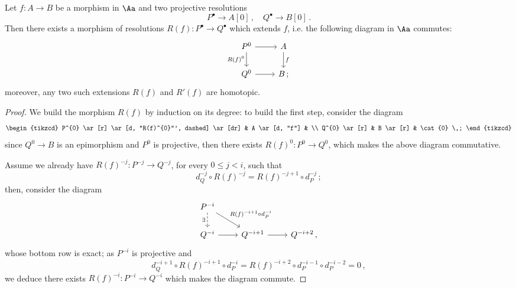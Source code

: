 \begin{prop}\label{res-htp}
    Let $f : A \to B$ be a morphism in $\Aa$ and two projective resolutions
    \begin{equation*}
        P^{\bullet} \longrightarrow A{[0]}\,, \quad
        Q^{\bullet} \longrightarrow B{[0]}\,.
    \end{equation*}
    Then there exists a morphism of resolutions 
    $R(f) : P^{\bullet} \to Q^{\bullet}$ which extends $f$,
    i.e. the following diagram in $\Aa$ commutes:
    \begin{equation*}
        \begin{tikzcd}
            P^{0} \ar[r] \ar[d, "R(f)^{0}"'] 
            & A \ar[d, "f"] \\
            Q^{0} \ar[r] & B\,;
        \end{tikzcd}
    \end{equation*}
    moreover, any two such extensions $R(f)$ and $R'(f)$ are homotopic.
    \begin{proof}
        We build the morphism $R(f)$ by induction on its degree:
        to build the first step, consider the diagram
        \begin{equation*}
        \begin{tikzcd}
            P^{0} \ar[r] \ar[d, "R(f)^{0}"', dashed] \ar[dr]
            & A \ar[d, "f"] & \\
            Q^{0} \ar[r] & B \ar[r] & \cat{0} \,;
        \end{tikzcd}
    \end{equation*}
    since $Q^{0} \to B$ is an epimorphism and $P^{0}$
    is projective, then there exists $R(f)^{0}:P^{0} \to Q^{0}$,
    which makes the above diagram commutative.

    Assume we already have $R(f)^{-j} : P^{-j} \to Q^{-j}$, 
    for every $0 \le j < i$, such that
    \begin{equation*}
        d_{Q}^{-j} \circ R(f)^{-j} = R(f)^{-j+1} \circ d_{P}^{-j}\,;
    \end{equation*}
    then, consider the diagram
    \begin{equation*}
        \begin{tikzcd}
            P^{-i} \ar[d, "\exists"', dashed] 
            \ar[dr, "R(f)^{-i+1} \circ d_{P}^{-i}"]
            && \\ %
            Q^{-i} \ar[r] & Q^{-i+1} \ar[r] & Q^{-i+2}\,,
        \end{tikzcd}
    \end{equation*}
    whose bottom row is exact; as $P^{-i}$ is projective and
    \begin{equation*}
        d^{-i+1}_{Q} \circ R(f)^{-i+1} \circ d_{P}^{-i}
        = R(f)^{-i+2} \circ d_{P}^{-i-1} \circ d_{P}^{-i-2} = 0\,,
    \end{equation*}
    we deduce there exists $R(f)^{-i}:P^{-i} \to Q^{-i}$
    which makes the diagram commute.


\end{proof}
\end{prop}
